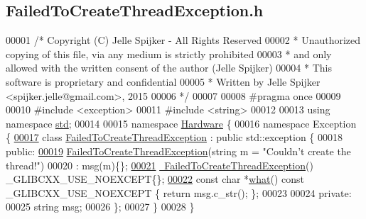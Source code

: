 \hypertarget{_failed_to_create_thread_exception_8h_source}{}\subsection{Failed\+To\+Create\+Thread\+Exception.\+h}
\label{_failed_to_create_thread_exception_8h_source}

\begin{DoxyCode}
00001 \textcolor{comment}{/* Copyright (C) Jelle Spijker - All Rights Reserved}
00002 \textcolor{comment}{ * Unauthorized copying of this file, via any medium is strictly prohibited}
00003 \textcolor{comment}{ * and only allowed with the written consent of the author (Jelle Spijker)}
00004 \textcolor{comment}{ * This software is proprietary and confidential}
00005 \textcolor{comment}{ * Written by Jelle Spijker <spijker.jelle@gmail.com>, 2015}
00006 \textcolor{comment}{ */}
00007 
00008 \textcolor{preprocessor}{#pragma once}
00009 
00010 \textcolor{preprocessor}{#include <exception>}
00011 \textcolor{preprocessor}{#include <string>}
00012 
00013 \textcolor{keyword}{using namespace }\hyperlink{namespacestd}{std};
00014 
00015 \textcolor{keyword}{namespace }\hyperlink{namespace_hardware}{Hardware} \{
00016 \textcolor{keyword}{namespace }Exception \{
\hypertarget{_failed_to_create_thread_exception_8h_source_l00017}{}\hyperlink{class_hardware_1_1_exception_1_1_failed_to_create_thread_exception}{00017} \textcolor{keyword}{class }\hyperlink{class_hardware_1_1_exception_1_1_failed_to_create_thread_exception}{FailedToCreateThreadException} : \textcolor{keyword}{public} std::exception \{
00018 \textcolor{keyword}{public}:
\hypertarget{_failed_to_create_thread_exception_8h_source_l00019}{}\hyperlink{class_hardware_1_1_exception_1_1_failed_to_create_thread_exception_acb17213ac3aeb351ca6d96cf8e0801f4}{00019}   \hyperlink{class_hardware_1_1_exception_1_1_failed_to_create_thread_exception_acb17213ac3aeb351ca6d96cf8e0801f4}{FailedToCreateThreadException}(\textcolor{keywordtype}{string} m = \textcolor{stringliteral}{"Couldn't create the thread!"})
00020       : msg(m)\{\};
\hypertarget{_failed_to_create_thread_exception_8h_source_l00021}{}\hyperlink{class_hardware_1_1_exception_1_1_failed_to_create_thread_exception_a1fdbe3e02a893ffe99a562c821329242}{00021}   \hyperlink{class_hardware_1_1_exception_1_1_failed_to_create_thread_exception_a1fdbe3e02a893ffe99a562c821329242}{~FailedToCreateThreadException}() \_GLIBCXX\_USE\_NOEXCEPT\{\};
\hypertarget{_failed_to_create_thread_exception_8h_source_l00022}{}\hyperlink{class_hardware_1_1_exception_1_1_failed_to_create_thread_exception_a4518723d8cb1f17d3f981d3a29220e28}{00022}   \textcolor{keyword}{const} \textcolor{keywordtype}{char} *\hyperlink{class_hardware_1_1_exception_1_1_failed_to_create_thread_exception_a4518723d8cb1f17d3f981d3a29220e28}{what}() const \_GLIBCXX\_USE\_NOEXCEPT \{ \textcolor{keywordflow}{return} msg.c\_str(); \};
00023 
00024 \textcolor{keyword}{private}:
00025   \textcolor{keywordtype}{string} msg;
00026 \};
00027 \}
00028 \}
\end{DoxyCode}
